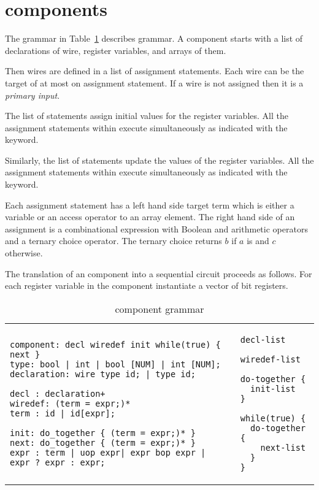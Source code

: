 \section{\this components}
\label{s:this}
The grammar in Table~\ref{t:gr} describes \caig grammar. 
A \caig component starts with a list of declarations of 
wire,  register variables, and arrays of them. 

Then wires are defined in a list of assignment statements. 
Each wire can be the target of at most on assignment statement. 
If a wire is not assigned then it is a {\em primary input}. 

The  list of statements assign initial values for 
the register variables. 
All the assignment statements within  execute
simultaneously as indicated with the  keyword.

Similarly, the  list of statements update the values 
of the register variables. 
All the assignment statements within  execute 
simultaneously as indicated with the  keyword.

Each assignment statement has a left hand side target term 
which is either a variable or an access operator to an 
array element. 
The right hand side of an assignment is a combinational expression
with Boolean and arithmetic operators and a ternary choice 
operator. The ternary choice  returns $b$ if $a$ 
is \true and $c$ otherwise. 

The translation of an \caig component into a sequential circuit 
proceeds as follows. 
For each register variable in the component instantiate a 
vector of bit registers. 

\begin{table}
\begin{tabular}{p{6cm}p{6cm}}
\begin{Verbatim}
component: decl wiredef init while(true) { next } 
type: bool | int | bool [NUM] | int [NUM]; 
declaration: wire type id; | type id;

decl : declaration+
wiredef: (term = expr;)*
term : id | id[expr]; 

init: do_together { (term = expr;)* }
next: do_together { (term = expr;)* }
expr : term | uop expr| expr bop expr | expr ? expr : expr;
\end{Verbatim}
&
\begin{lstlisting}
decl-list

wiredef-list

do-together {
  init-list
}

while(true) {
  do-together {
    next-list
  }
}
\end{lstlisting}
\end{tabular}
\caption{\caig component grammar}
\label{t:gr}
\end{table}
